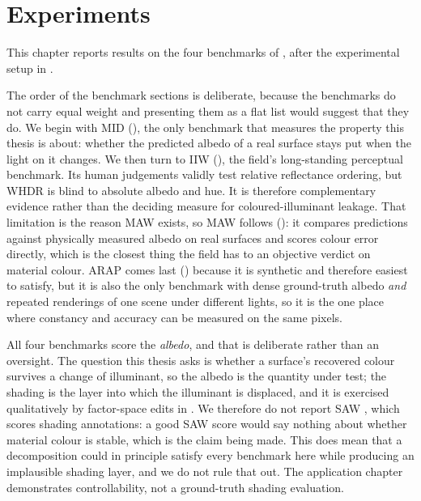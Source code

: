\chapter{Experiments}
\label{ch:experiments}

This chapter reports results on the four benchmarks of ,
after the experimental setup in .

The order of the benchmark sections is deliberate, because the benchmarks do not
carry equal weight and presenting them as a flat list would suggest that they do.
We begin with MID (), the only benchmark that measures the
property this thesis is about: whether the predicted albedo of a real surface stays
put when the light on it changes.
We then turn to IIW (), the field's long-standing
perceptual benchmark. Its human judgements validly test relative reflectance
ordering, but WHDR is blind to absolute albedo and hue. It is therefore
complementary evidence rather than the deciding measure for coloured-illuminant
leakage.
That limitation is the reason MAW exists, so MAW follows ():
it compares predictions against physically measured albedo on real surfaces and
scores colour error directly, which is the closest thing the field has to an
objective verdict on material colour.
ARAP comes last () because it is synthetic and therefore
easiest to satisfy, but it is also the only benchmark with dense ground-truth albedo
\emph{and} repeated renderings of one scene under different lights, so it is the one
place where constancy and accuracy can be measured on the same pixels.

All four benchmarks score the \emph{albedo}, and that is deliberate rather than an
oversight. The question this thesis asks is whether a surface's recovered colour survives a
change of illuminant, so the albedo is the quantity under test; the shading is the layer
into which the illuminant is displaced, and it is exercised qualitatively by factor-space
edits in . We therefore do not report SAW , which scores
shading annotations: a good SAW score would say nothing about whether material colour is
stable, which is the claim being made. This does mean that a decomposition could in
principle satisfy every benchmark here while producing an implausible shading layer, and we
do not rule that out. The application chapter demonstrates controllability, not a
ground-truth shading evaluation.

